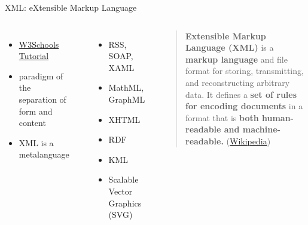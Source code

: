 \begin{frame}{XML: eXtensible Markup Language}
\begin{columns}
\begin{itemize}\small 
    \item \href{https://www.w3schools.com/xml/default.asp}{W3Schools Tutorial} 
    \item {paradigm of the separation of form and content} 
    \item {XML is a metalanguage}
\end{itemize}
 \\

\begin{itemize}\scriptsize 
    \item {RSS}, SOAP, XAML 
    \item {MathML}, {GraphML}~ 
    \item {XHTML}~
    \item {RDF}~
    \item {KML}~ 
    \item {Scalable Vector Graphics (SVG)}
\end{itemize}

\begin{block}{}
\begin{quote}
    \textbf{Extensible Markup Language (XML)} is a \textbf{markup language} and file format for storing, transmitting, and reconstructing arbitrary data. It defines a \textbf{set of rules for encoding documents} in a format that is \textbf{both human-readable and machine-readable.}  (\href{https://en.wikipedia.org/wiki/XML}{Wikipedia})
\end{quote}
\end{block}
\end{columns}

\end{frame}



